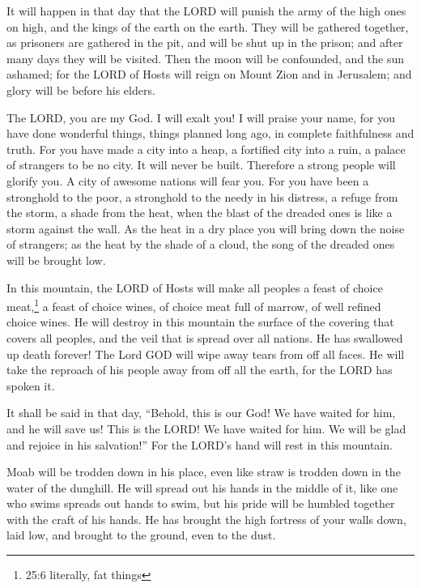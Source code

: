 \myverse{}It will happen in that day that the LORD will punish the army
of the high ones on high, and the kings of the earth on the earth.
\myverse{}They will be gathered together, as prisoners are gathered in the pit, and
will be shut up in the prison; and after many days they will be visited.
\myverse{}Then the moon will be confounded, and the sun ashamed; for the LORD of Hosts
will reign on Mount Zion and in Jerusalem; and glory will be before his elders.


\mychapter{} \myverse*{}The LORD, you are my God. I will exalt you! I will praise your
name, for you have done wonderful things, things planned long ago, in complete faithfulness and truth.
\myverse{}For you have made a city into a heap, a fortified city into a ruin, a palace
of strangers to be no city. It will never be built.
\myverse{}Therefore a strong people will glorify you. A city of awesome nations will
fear you.
\myverse{}For you have been a stronghold to the poor, a stronghold to the needy in his
distress, a refuge from the storm, a shade from the heat, when the blast of the dreaded ones is like a
storm against the wall.
\myverse{}As the heat in a dry place you will bring down the noise of strangers; as the
heat by the shade of a cloud, the song of the dreaded ones will be brought low.

\myverse{}In this mountain, the LORD of Hosts will make all peoples a feast
of choice meat,\footnote{25:6 literally, fat things} a feast of choice wines, of choice meat full of marrow, of well
refined choice wines.
\myverse{}He will destroy in this mountain the surface of the covering that covers all
peoples, and the veil that is spread over all nations.
\myverse{}He has swallowed up death forever! The Lord GOD will wipe away tears from off
all faces. He will take the reproach of his people away from off all the earth, for the LORD has spoken
it.

\myverse{}It shall be said in that day, “Behold, this is our God! We have
waited for him, and he will save us! This is the LORD! We have waited for him. We will be glad and rejoice
in his salvation!”
\myverse{}For the LORD’s hand will rest in this mountain.

Moab will be trodden down in his place, even like straw is trodden down in the water of the
dunghill.
\myverse{}He will spread out his hands in the middle of it, like one who swims spreads
out hands to swim, but his pride will be humbled together with the craft of his hands.
\myverse{}He has brought the high fortress of your walls down, laid low, and brought
to the ground, even to the dust.


